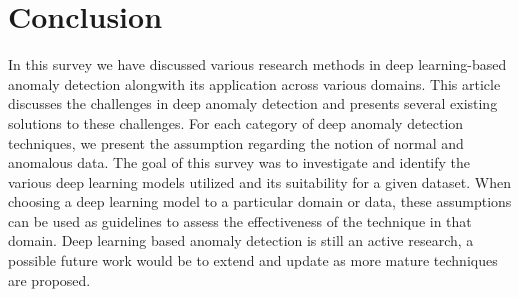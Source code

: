 \section{Conclusion}
\label{sec:conclusion}
In this survey we have discussed various research methods in deep learning-based anomaly detection
alongwith its application across various domains. This article discusses the challenges in deep anomaly detection and presents  several existing solutions to these challenges. For each category of deep anomaly detection techniques, we present the assumption regarding the notion of normal and anomalous data.  The goal of this survey was to investigate and identify the various deep learning models utilized and its suitability for a given dataset. When choosing a deep learning model to a particular domain or data, these assumptions can be used as guidelines to assess the effectiveness of the technique in that domain. Deep learning based anomaly detection is still an active research, a possible future work would be to extend and update as more mature techniques are proposed.



